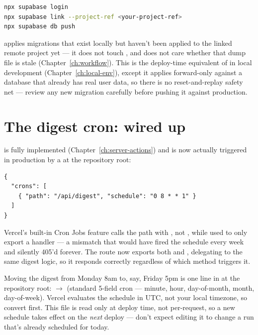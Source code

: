 \begin{lstlisting}[style=olkcodebash, language=bash, caption={Linking to and migrating the hosted project (run once per new migration batch)}]
npx supabase login
npx supabase link --project-ref <your-project-ref>
npx supabase db push
\end{lstlisting}

\begin{olknote}
 applies migrations that exist locally but haven't been applied to the linked remote project yet — it does not touch , and does not care whether that dump file is stale (Chapter~\ref{ch:workflow}). This is the deploy-time equivalent of  in local development (Chapter~\ref{ch:local-env}), except it applies forward-only against a database that already has real user data, so there is no reset-and-replay safety net — review any new migration carefully before pushing it against production.
\end{olknote}

\section{The digest cron: wired up}

 is fully implemented (Chapter~\ref{ch:server-actions}) and is now actually triggered in production by a  at the repository root:

\begin{lstlisting}[caption={vercel.json — schedules the weekly digest}]
{
  "crons": [
    { "path": "/api/digest", "schedule": "0 8 * * 1" }
  ]
}
\end{lstlisting}

\begin{olknote}
Vercel's built-in Cron Jobs feature calls the path with , not , while  used to only export a  handler — a mismatch that would have fired the schedule every week and silently 405'd forever. The route now exports both  and , delegating to the same digest logic, so it responds correctly regardless of which method triggers it.
\end{olknote}

\begin{olkhowto}
Moving the digest from Monday 8am to, say, Friday 5pm is one line in  at the repository root:  $\to$  (standard 5-field cron — minute, hour, day-of-month, month, day-of-week). Vercel evaluates the schedule in UTC, not your local timezone, so convert first. This file is read only at deploy time, not per-request, so a new schedule takes effect on the \emph{next} deploy — don't expect editing it to change a run that's already scheduled for today.
\end{olkhowto}

